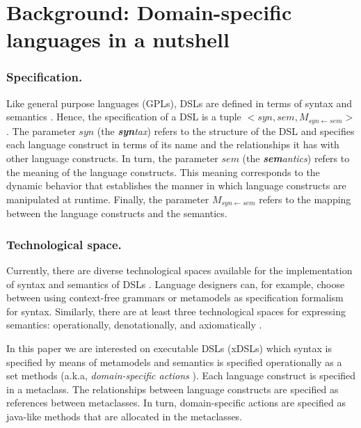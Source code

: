 \section{Background: Domain-specific languages in a nutshell}
\label{sec:background}

\subsubsection{Specification.} Like general purpose languages (GPLs), DSLs are defined in terms of syntax and semantics \cite{Harel:2004b}. Hence, the specification of a DSL is a tuple $<syn,sem,M_{syn\leftarrow sem}>$ \cite{Combemale:2013}. The parameter $syn$ (the \textit{\textbf{syn}tax}) refers to the structure of the DSL and specifies each language construct in terms of its name and the relationships it has with other language constructs. In turn, the parameter $sem$ (the \textit{\textbf{sem}antics}) refers to the meaning of the language constructs. This meaning corresponds to the dynamic behavior that establishes the manner in which language constructs are manipulated at runtime. Finally, the parameter $M_{syn\leftarrow sem}$ refers to the mapping between the language constructs and the semantics. 
 

\vspace{-3mm}
\subsubsection{Technological space.} Currently, there are diverse technological spaces available for the implementation of syntax and semantics of DSLs \cite{Mernik:2005b}. Language designers can, for example, choose between using context-free grammars or metamodels as specification formalism for syntax. Similarly, there are at least three technological spaces for expressing semantics: operationally, denotationally, and axiomatically \cite{Mosses:2001}.

In this paper we are interested on executable DSLs (xDSLs) which syntax is specified by means of metamodels and semantics is specified operationally as a set methods (a.k.a, \textit{domain-specific actions} \cite{Combemale:2013}). Each language construct is specified in a metaclass. The relationships between language constructs are specified as references between metaclasses. In turn, domain-specific actions are specified as java-like methods that are allocated in the metaclasses.
 
\vspace{-3mm}
